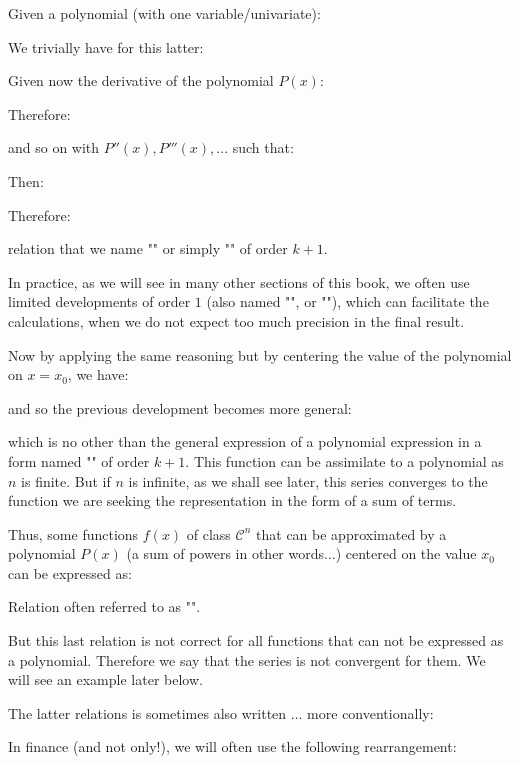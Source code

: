 	Given a polynomial (with one variable/univariate):
	
	We trivially have for this latter:
	
	Given now the derivative of the polynomial $P (x)$:
	
	Therefore:
	
	and so on with $P''(x), P'''(x), ...$ such that:
	
	Then:
	
	Therefore:
	
	relation that we name "" or simply "" of order $k + 1$.
	\begin{tcolorbox}[title=Remark,colframe=black,arc=10pt]
	In practice, as we will see in many other sections of this book, we often use limited developments of order $1$ (also named "", or ""), which can facilitate the calculations, when we do not expect too much precision in the final result.
	\end{tcolorbox}
	Now by applying the same reasoning but by centering the value of the polynomial on $x=x_0$, we have:
	
	and so the previous development becomes more general:
	
	which is no other than the general expression of a polynomial expression in a form named "" of order $k + 1$. This function can be assimilate to a polynomial as $n$ is finite. But if $n$ is infinite, as we shall see later, this series converges to the function we are seeking the representation in the form of a sum of terms.
	
	Thus, some functions $f (x)$ of class $\mathcal{C}^n$ that can be approximated by a polynomial $P (x)$ (a sum of powers in other words...) centered on the value $x_0$ can be expressed as:
	
	Relation often referred to as "".
	
	But this last relation is not correct for all functions that can not be expressed as a polynomial. Therefore we say that the series is not convergent for them. We will see an example later below.
	
	The latter relations is sometimes also written ... more conventionally:
	
	In finance (and not only!), we will often use the following rearrangement:
	
